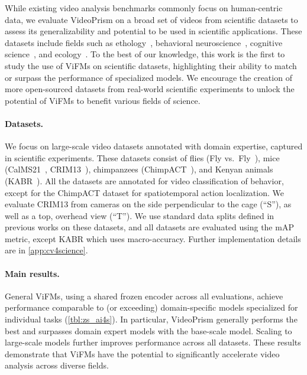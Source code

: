 \documentclass{article}
\theoremstyle{plain}
\theoremstyle{definition}
\theoremstyle{remark}
\newcommand{\OURS}{VideoPrism\xspace}
\newcommand{\myparagraph}[1]{\paragraph{#1}}
\begin{document}
While existing video analysis benchmarks commonly focus on human-centric data, we evaluate \OURS on a broad set of videos from scientific datasets to assess its generalizability and potential to be used in scientific applications.
These datasets include fields such as ethology~\cite{eyjolfsdottir2014detecting}, behavioral neuroscience~\cite{sun2021multi,burgos2012social}, cognitive science~\cite{ma2023chimpact}, and ecology~\cite{kholiavchenko2024kabr}. 
To the best of our knowledge, this work is the first to study the use of ViFMs on scientific datasets, highlighting their ability to match or surpass the performance of specialized models. We encourage the creation of more open-sourced datasets from real-world scientific experiments to unlock the potential of ViFMs to benefit various fields of science.



\myparagraph{Datasets.} 
We focus on large-scale video datasets annotated with domain expertise, captured in scientific experiments. These datasets consist of flies (Fly vs.\ Fly~\cite{eyjolfsdottir2014detecting}), mice  (CalMS21~\cite{sun2021multi}, CRIM13~\cite{burgos2012social}), chimpanzees (ChimpACT~\cite{ma2023chimpact}), and Kenyan animals (KABR~\cite{kholiavchenko2024kabr}). 
All the datasets are annotated for video classification of behavior, except for the ChimpACT dataset for spatiotemporal action localization.
We evaluate CRIM13 from cameras on the side perpendicular to the cage (``S''), as well as a top, overhead view (``T'').
We use standard data splits defined in previous works on these datasets, and all datasets are evaluated using the mAP metric, except KABR which uses macro-accuracy. Further implementation details are in \cref{app:cv4science}.










\myparagraph{Main results.} 
General ViFMs, using a shared frozen encoder across all evaluations, achieve performance comparable to (or exceeding) domain-specific models specialized for individual tasks (\cref{tbl:zs_ai4s}).  
In particular, \OURS generally performs the best and surpasses domain expert models with the base-scale model. Scaling to large-scale models further improves performance across all datasets.
These results demonstrate that ViFMs have the potential to significantly accelerate video analysis across diverse fields.
\end{document}
